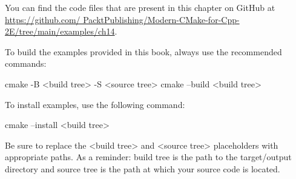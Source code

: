 You can find the code files that are present in this chapter on GitHub at \url{https://github.com/ PacktPublishing/Modern-CMake-for-Cpp-2E/tree/main/examples/ch14}.

To build the examples provided in this book, always use the recommended commands:

\begin{shell}
cmake -B <build tree> -S <source tree>
cmake --build <build tree>
\end{shell}

To install examples, use the following command:

\begin{shell}
cmake --install <build tree>
\end{shell}

Be sure to replace the <build tree> and <source tree> placeholders with appropriate paths. As a reminder: build tree is the path to the target/output directory and source tree is the path at which your source code is located.





